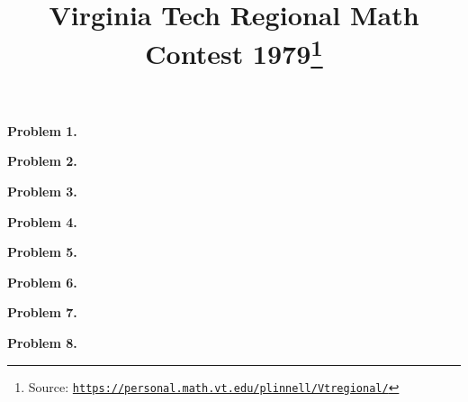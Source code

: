\documentclass[10pt]{article}
\newcommand{\vtrmc}{https://personal.math.vt.edu/plinnell/Vtregional/}
\newcommand{\source}{\href{\vtrmc}{\texttt{\vtrmc}}}
\newcommand{\problem}[1]{\textbf{Problem #1.}}
\newcommand{\inputproblem}[2]{}
\begin{document}
\title{Virginia Tech Regional Math Contest 1979\footnote{Source: \source}}
\author{\vspace{-2ex}}
\date{\vspace{-6ex}} %
\maketitle

\problem{1}
\inputproblem{1979}{1}

\problem{2}
\inputproblem{1979}{2}

\problem{3}
\inputproblem{1979}{3}

\problem{4}
\inputproblem{1979}{4}

\problem{5}
\inputproblem{1979}{5}

\problem{6}
\inputproblem{1979}{6}

\problem{7}
\inputproblem{1979}{7}

\problem{8}
\inputproblem{1979}{8}
\end{document}
